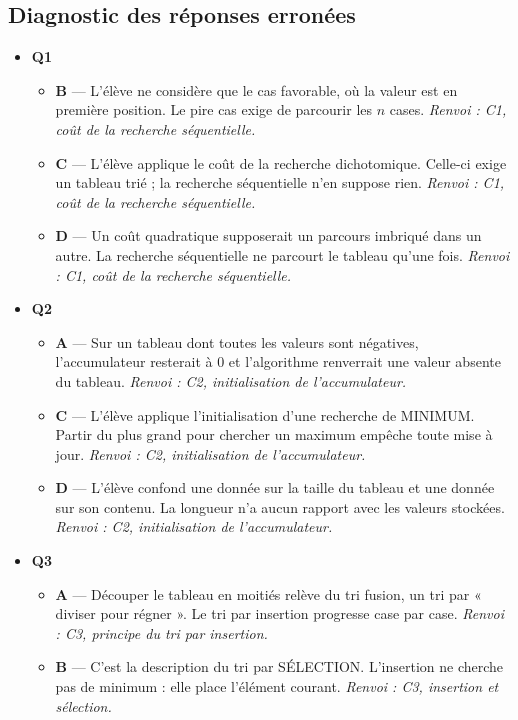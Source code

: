 \subsection*{Diagnostic des réponses erronées}

\begin{itemize}
  \item \textbf{Q1}
  \begin{itemize}
    \item \textbf{B} — L'élève ne considère que le cas favorable, où la valeur est en première position. Le pire cas exige de parcourir les $n$ cases. \emph{Renvoi : C1, coût de la recherche séquentielle.}
    \item \textbf{C} — L'élève applique le coût de la recherche dichotomique. Celle-ci exige un tableau trié ; la recherche séquentielle n'en suppose rien. \emph{Renvoi : C1, coût de la recherche séquentielle.}
    \item \textbf{D} — Un coût quadratique supposerait un parcours imbriqué dans un autre. La recherche séquentielle ne parcourt le tableau qu'une fois. \emph{Renvoi : C1, coût de la recherche séquentielle.}
  \end{itemize}
  \item \textbf{Q2}
  \begin{itemize}
    \item \textbf{A} — Sur un tableau dont toutes les valeurs sont négatives, l'accumulateur resterait à $0$ et l'algorithme renverrait une valeur absente du tableau. \emph{Renvoi : C2, initialisation de l'accumulateur.}
    \item \textbf{C} — L'élève applique l'initialisation d'une recherche de MINIMUM. Partir du plus grand pour chercher un maximum empêche toute mise à jour. \emph{Renvoi : C2, initialisation de l'accumulateur.}
    \item \textbf{D} — L'élève confond une donnée sur la taille du tableau et une donnée sur son contenu. La longueur n'a aucun rapport avec les valeurs stockées. \emph{Renvoi : C2, initialisation de l'accumulateur.}
  \end{itemize}
  \item \textbf{Q3}
  \begin{itemize}
    \item \textbf{A} — Découper le tableau en moitiés relève du tri fusion, un tri par « diviser pour régner ». Le tri par insertion progresse case par case. \emph{Renvoi : C3, principe du tri par insertion.}
    \item \textbf{B} — C'est la description du tri par SÉLECTION. L'insertion ne cherche pas de minimum : elle place l'élément courant. \emph{Renvoi : C3, insertion et sélection.}

\end{itemize}
\end{itemize}
